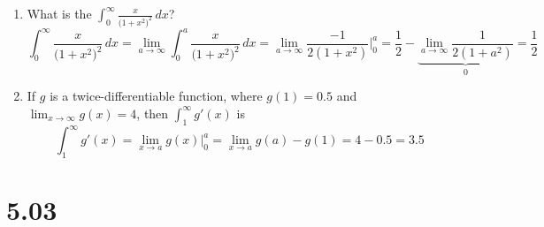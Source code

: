 \documentclass[12pt]{article}
\begin{document}
\begin{enumerate}
    \item What is the $\int_{0}^{\infty} \frac{x}{\big(1+x^2\big)^2}\, dx$?
    $$\int_{0}^{\infty} \frac{x}{\big(1+x^2\big)^2}\, dx = \lim_{a\to\infty} \int_{0}^{a}\frac{x}{\big(1+x^2\big)^2}\, dx = \lim_{a\to\infty} \frac{-1}{2(1+x^2)}\biggr\rvert_{0}^{a} = \frac{1}{2}-\underbrace{\lim_{a\to\infty}\frac{1}{2(1+a^2)}}_{0} = \boxed{\frac{1}{2}}$$
    \item If $g$ is a twice-differentiable function, where $g(1) = 0.5$ and $\lim_{x\to\infty}g(x)=4$, then $\int_{1}^{\infty} g'(x)$ is
    $$\int_{1}^{\infty} g'(x) = \lim_{x\to a} g(x)\biggr\rvert_{0}^{a} = \lim_{x\to a} g(a)-g(1)= 4-0.5=\boxed{3.5}$$

\end{enumerate}
\section*{5.03}
\end{document}
